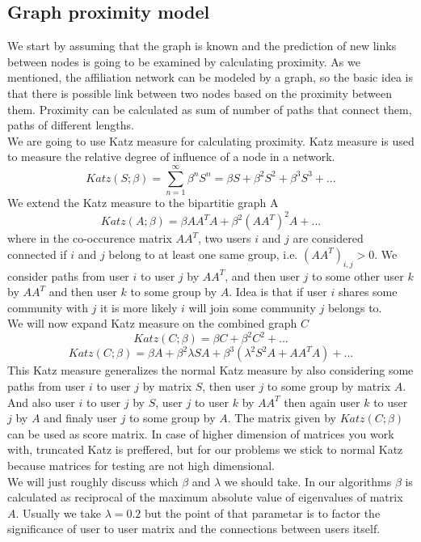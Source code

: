 \documentclass[twoside,twocolumn]{article}
\begin{document}
\subsection{Graph proximity model}
We start by assuming that the graph is known and the prediction of new links between nodes is going to be examined by calculating proximity. As we mentioned, the affiliation network can be modeled by a graph, so the basic idea is that there is possible link between two nodes based on the proximity between them. Proximity can be calculated as sum of number of paths  that connect them, paths of different lengths. \\
We are going to use Katz measure for calculating proximity. Katz measure is used to measure the relative degree of influence of a node in a network.
\[ Katz(S;\beta) = \sum_{n=1}^{\infty} \beta^n S^n = \beta S +\beta^2 S^2 + \beta^3 S^3 + ...  \]
We extend the Katz measure to the bipartitie graph A
\[ Katz(A;\beta) = \beta A A^T A +\beta^2 (AA^T)^2 A + ...  \]
where in the co-occurence matrix $A A^T$, two users $i$ and $j$ are considered connected if $i$ and $j$ belong to at least one same group, i.e. $(AA^T)_{i,j} > 0$. We consider paths from user $i$ to user $j$ by $AA^T$, and then user $j$ to some other user $k$ by $AA^T$ and then user $k$ to some group by $A$. Idea is that if user $i$ shares some community with $j$ it is more likely $i$ will join some community $j$ belongs to. \\
We will now expand Katz measure on the combined graph $C$
\[ Katz(C;\beta) = \beta C +\beta^2 C^2 + ...  \]
\[ Katz(C;\beta) = \beta A +\beta^2 \lambda S A +  \beta^3( \lambda^2 S^2A + A A^T A ) + ...  \]
This Katz measure generalizes the normal Katz measure by also considering some paths from user $i$ to user $j$ by matrix $S$, then user $j$ to some group by matrix $A$. And also user $i$ to user $j$ by $S$, user $j$ to user $k$ by $AA^T$ then again user $k$ to user $j$ by $A$ and finaly user $j$ to some group by $A$. The matrix given by $Katz(C;\beta)$ can be used as score matrix.
In case of higher dimension of matrices you work with, truncated Katz is preffered, but for our problems we stick to normal Katz because matrices for testing are not high dimensional. \\
We will just roughly discuss which $\beta$ and $\lambda$ we should take. In our algorithms $\beta$ is calculated as reciprocal of the maximum absolute value of eigenvalues of matrix $A$. Usually we take $\lambda = 0.2$ but the point of that parametar is to factor the significance of user to user matrix and the connections between users itself.
\end{document}

